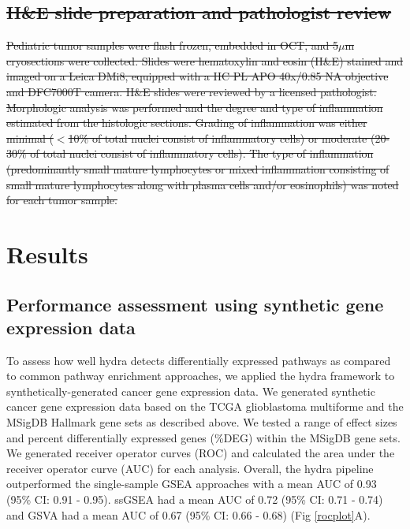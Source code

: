 \documentclass[10pt,letterpaper]{article}
\providecommand{\DIFdeltex}[1]{{\protect\color{red}\sout{#1}}}                      %
\providecommand{\DIFdelend}{} %
\providecommand{\DIFdel}[1]{\texorpdfstring{\DIFdeltex{#1}}{}} %
\DeclareRobustCommand{\DIFdelend}{\DIFOaddend \let\includegraphics\DIFOincludegraphics} %
\begin{document}
\subsection*{\DIFdel{H\&E slide preparation and pathologist review}}
\DIFdel{Pediatric tumor samples were flash frozen, embedded in OCT, and 5$\mu$m cryosections were collected. Slides were hematoxylin and eosin (H\&E) stained and imaged on a Leica DMi8, equipped with a HC PL APO 40x/0.85 NA objective and DFC7000T camera. H\&E slides were reviewed by a licensed pathologist.  Morphologic analysis was performed and the degree and type of inflammation estimated from the histologic sections. Grading of inflammation was either minimal ($<$10\% of total nuclei consist of inflammatory cells) or  moderate (20-30\% of total nuclei consist of inflammatory cells). The type of inflammation (predominantly small mature lymphocytes or mixed inflammation consisting of small mature lymphocytes along with plasma cells and/or eosinophils) was noted for each tumor sample.
}%

\DIFdelend %
\section*{Results}
\subsection*{Performance assessment using synthetic gene expression data}
To assess how well hydra detects differentially expressed pathways as compared to common pathway enrichment approaches, we applied the hydra framework to synthetically-generated cancer gene expression data. We generated synthetic cancer gene expression data based on the TCGA glioblastoma multiforme and the MSigDB Hallmark gene sets as described above. We tested a range of effect sizes and percent differentially expressed genes (\%DEG) within the MSigDB gene sets. We generated receiver operator curves (ROC) and calculated the area under the receiver operator curve (AUC) for each analysis. Overall, the hydra pipeline outperformed the single-sample GSEA approaches with a mean AUC of 0.93 (95\% CI: 0.91 - 0.95). ssGSEA had a mean AUC of 0.72 (95\% CI: 0.71 - 0.74) and GSVA had a mean AUC of 0.67 (95\% CI: 0.66 - 0.68) (Fig \ref{rocplot}A).
\end{document}
